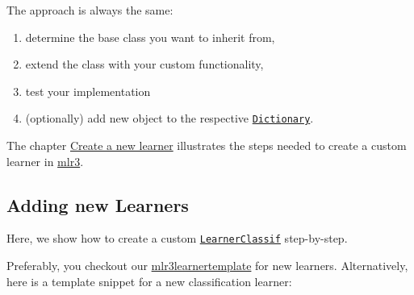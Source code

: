 \documentclass[]{article}
\newenvironment{Shaded}{\begin{snugshade}}{\end{snugshade}}
\newcommand{\ControlFlowTok}[1]{\textcolor[rgb]{0.13,0.29,0.53}{\textbf{#1}}}
\newcommand{\DataTypeTok}[1]{\textcolor[rgb]{0.13,0.29,0.53}{#1}}
\newcommand{\KeywordTok}[1]{\textcolor[rgb]{0.13,0.29,0.53}{\textbf{#1}}}
\newcommand{\NormalTok}[1]{#1}
\newcommand{\OperatorTok}[1]{\textcolor[rgb]{0.81,0.36,0.00}{\textbf{#1}}}
\newcommand{\StringTok}[1]{\textcolor[rgb]{0.31,0.60,0.02}{#1}}
\providecommand{\tightlist}{%
  \setlength{\itemsep}{0pt}\setlength{\parskip}{0pt}}
\renewenvironment{Shaded} {\begin{snugshade}\small} {\end{snugshade}}
\begin{document}
The approach is always the same:

\begin{enumerate}
\def\labelenumi{\arabic{enumi}.}
\tightlist
\item
  determine the base class you want to inherit from,
\item
  extend the class with your custom functionality,
\item
  test your implementation
\item
  (optionally) add new object to the respective \href{https://mlr3misc.mlr-org.com/reference/Dictionary.html}{\texttt{Dictionary}}.
\end{enumerate}

The chapter \protect\hyperlink{extending-learners}{Create a new learner} illustrates the steps needed to create a custom learner in \href{https://mlr3.mlr-org.com}{mlr3}.

\hypertarget{extending-learners}{%
\subsection{Adding new Learners}\label{extending-learners}}

Here, we show how to create a custom \href{https://mlr3.mlr-org.com/reference/LearnerClassif.html}{\texttt{LearnerClassif}} step-by-step.

Preferably, you checkout our \href{https://github.com/mlr-org/mlr3learnertemplate}{mlr3learnertemplate} for new learners.
Alternatively, here is a template snippet for a new classification learner:

\begin{Shaded}
\end{Shaded}
\end{document}
